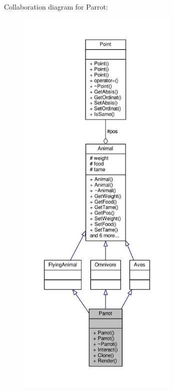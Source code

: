 Collaboration diagram for Parrot\+:
\nopagebreak
\begin{figure}[H]
\begin{center}
\leavevmode
\includegraphics[height=550pt]{classParrot__coll__graph}
\end{center}
\end{figure}
